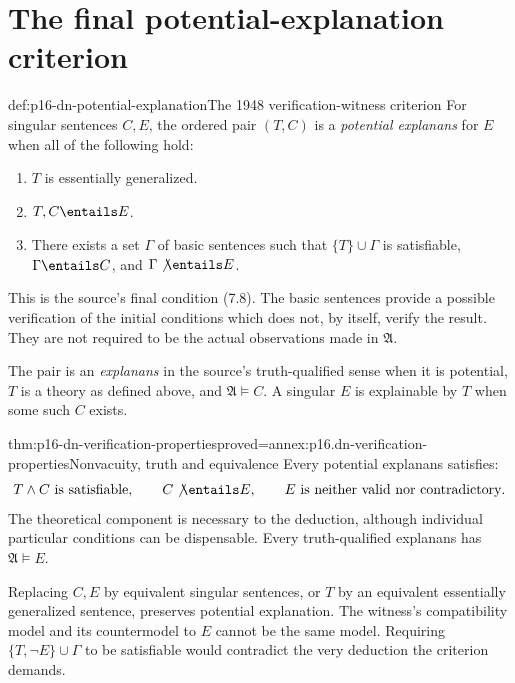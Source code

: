 \section{The final potential-explanation criterion}
\label{sec:p16-dn-verification}

\begin{hbdefinition}{def:p16-dn-potential-explanation}{The 1948 verification-witness criterion}
For singular sentences \(C,E\), the ordered pair
\((T,C)\) is a \emph{potential explanans} for \(E\)
when all of the following hold:
\begin{enumerate}
\item \(T\) is essentially generalized.
\item \(T,C\entails E\).
\item There exists a set \(\Gamma\) of basic sentences
      such that \(\{T\}\cup\Gamma\) is satisfiable,
      \(\Gamma\entails C\), and \(\Gamma\not\entails E\).
\end{enumerate}
This is the source's final condition (7.8).
The basic sentences provide a possible verification
of the initial conditions which does not, by itself,
verify the result. They are not required to be the
actual observations made in \(\mathfrak A\).

The pair is an \emph{explanans} in the source's
truth-qualified sense when it is potential,
\(T\) is a theory as defined above, and
\(\mathfrak A\models C\). A singular \(E\) is
explainable by \(T\) when some such \(C\) exists.
\end{hbdefinition}

\begin{hbtheorem}{thm:p16-dn-verification-properties}{proved=annex:p16.dn-verification-properties}{Nonvacuity, truth and equivalence}
Every potential explanans satisfies:
\[
 T\land C\text{ is satisfiable},\qquad
 C\not\entails E,\qquad
 E\text{ is neither valid nor contradictory}.
\]
The theoretical component is necessary to the
deduction, although individual particular
conditions can be dispensable.
Every truth-qualified explanans has
\(\mathfrak A\models E\).

Replacing \(C,E\) by equivalent singular
sentences, or \(T\) by an equivalent essentially
generalized sentence, preserves potential
explanation. The witness's compatibility model
and its countermodel to \(E\) cannot be the same model.
Requiring \(\{T,\neg E\}\cup\Gamma\)
to be satisfiable would contradict the very
deduction the criterion demands.
\end{hbtheorem}

